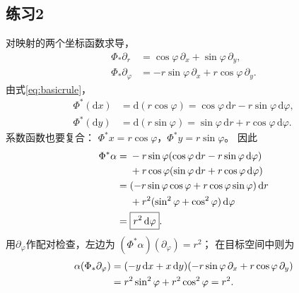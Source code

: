 \documentclass[11pt,a4paper,fontset=fandol]{ctexart}
\newcommand{\dd}{\mathrm{d}}
\begin{document}
\subsection{练习2}
对映射的两个坐标函数求导，
\begin{align}
 \Phi_*\partial_r
 &=\cos\varphi\,\partial_x+\sin\varphi\,\partial_y,\\
 \Phi_*\partial_\varphi
 &=-r\sin\varphi\,\partial_x+r\cos\varphi\,\partial_y.
\end{align}
由式\eqref{eq:basicrule}，
\begin{align}
 \Phi^*(\dd x)
 &=\dd(r\cos\varphi)
 =\cos\varphi\,\dd r-r\sin\varphi\,\dd\varphi,\\
 \Phi^*(\dd y)
 &=\dd(r\sin\varphi)
 =\sin\varphi\,\dd r+r\cos\varphi\,\dd\varphi.
\end{align}
系数函数也要复合：
$\Phi^*x=r\cos\varphi$，$\Phi^*y=r\sin\varphi$。
因此
\begin{align}
 \Phi^*\alpha
 ={}&-r\sin\varphi
       (\cos\varphi\,\dd r-r\sin\varphi\,\dd\varphi)\notag\\
    &+r\cos\varphi
       (\sin\varphi\,\dd r+r\cos\varphi\,\dd\varphi)\notag\\
 ={}&(-r\sin\varphi\cos\varphi+r\cos\varphi\sin\varphi)\,\dd r\notag\\
    &+r^2(\sin^2\varphi+\cos^2\varphi)\,\dd\varphi\notag\\
 ={}&\boxed{r^2\,\dd\varphi}.
\end{align}
用$\partial_\varphi$作配对检查，左边为
$(\Phi^*\alpha)(\partial_\varphi)=r^2$；
在目标空间中则为
\begin{align}
 \alpha(\Phi_*\partial_\varphi)
 &=(-y\,\dd x+x\,\dd y)
  (-r\sin\varphi\,\partial_x+r\cos\varphi\,\partial_y)\notag\\
 &=r^2\sin^2\varphi+r^2\cos^2\varphi=r^2.
\end{align}
\end{document}
